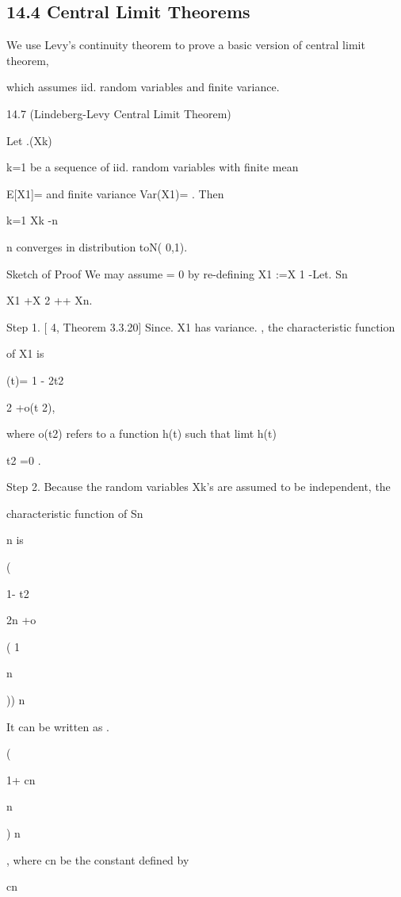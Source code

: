 \subsection*{14.4 Central Limit Theorems}

We use Levy's continuity theorem to prove a basic version of central limit theorem,

which assumes iid. random variables and finite variance.

\begin{thmbox}{14.7 (Lindeberg-Levy Central Limit Theorem)}
\end{thmbox}

Let .(Xk)\infty

k=1 be a sequence of iid. random variables with finite mean

E[X1]= \mu and finite variance Var(X1)= . Then

\sumn

k=1 Xk -n\mu

\sigma\sqrt n converges in distribution toN( 0,1).

Sketch of Proof We may assume \mu= 0 by re-defining X1 :=X 1 -\mu Let. Sn \coloneqq

X1 +X 2 +\cdot\cdot\cdot+ Xn.

Step 1. [ 4, Theorem 3.3.20] Since. X1 has variance. , the characteristic function

of X1 is

 (t)= 1 - \sigma2t2

2 +o(t 2),

where o(t2) refers to a function h(t) such that limt h(t)

t2 =0 .

Step 2. Because the random variables Xk's are assumed to be independent, the

characteristic function of Sn

\sigma\sqrt n is

(

1- t2

2n +o

( 1

n

)) n

It can be written as .

(

1+ cn

n

) n

, where cn be the constant defined by

cn

